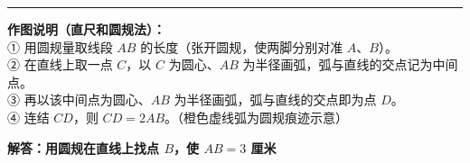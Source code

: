 \vspace{1cm}
\hrule
\vspace{0.4cm}

{\small\color{gray}
\textbf{作图说明（直尺和圆规法）：}\\
① 用圆规量取线段 $AB$ 的长度（张开圆规，使两脚分别对准 $A$、$B$）。\\
② 在直线上取一点 $C$，以 $C$ 为圆心、$AB$ 为半径画弧，弧与直线的交点记为中间点。\\
③ 再以该中间点为圆心、$AB$ 为半径画弧，弧与直线的交点即为点 $D$。\\
④ 连结 $CD$，则 $CD = 2AB$。\quad（橙色虚线弧为圆规痕迹示意）
}




\newpage

\begin{center}
  {\large\bfseries 解答：用圆规在直线上找点 $B$，使 $AB = 3$ 厘米}
\end{center}

\vspace{0.8cm}


